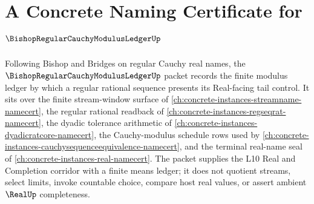 \chapter{A Concrete Naming Certificate for $\BishopRegularCauchyModulusLedgerUp$}
\label{ch:concrete-instances-bishop-regular-cauchy-modulus-ledger-namecert}

Following Bishop and Bridges on regular Cauchy real names, the $\BishopRegularCauchyModulusLedgerUp$ packet records the finite modulus ledger by which a regular rational sequence presents its Real-facing tail control. It sits over the finite stream-window surface of \autoref{ch:concrete-instances-streamname-namecert}, the regular rational readback of \autoref{ch:concrete-instances-regseqrat-namecert}, the dyadic tolerance arithmetic of \autoref{ch:concrete-instances-dyadicratcore-namecert}, the Cauchy-modulus schedule rows used by \autoref{ch:concrete-instances-cauchysequenceequivalence-namecert}, and the terminal real-name seal of \autoref{ch:concrete-instances-real-namecert}. The packet supplies the L10 Real and Completion corridor with a finite means ledger; it does not quotient streams, select limits, invoke countable choice, compare host real values, or assert ambient $\RealUp$ completeness.

